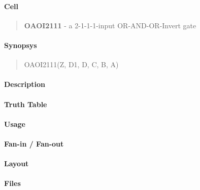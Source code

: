\label{OAOI2111}
\paragraph{Cell}
\begin{quote}
    \textbf{OAOI2111} - a 2-1-1-1-input OR-AND-OR-Invert gate
\end{quote}

\paragraph{Synopsys}
\begin{quote}
    OAOI2111(Z, D1, D, C, B, A)
\end{quote}

\paragraph{Description}

%

\paragraph{Truth Table}
%

\paragraph{Usage}

\paragraph{Fan-in / Fan-out}

\paragraph{Layout}

\paragraph{Files}
